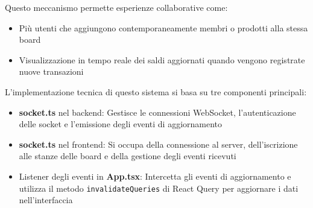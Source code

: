 \documentclass[11pt]{article}
\begin{document}
Questo meccanismo permette esperienze collaborative come:
\begin{itemize}
    \item Più utenti che aggiungono contemporaneamente membri o prodotti alla stessa board
    \item Visualizzazione in tempo reale dei saldi aggiornati quando vengono registrate nuove transazioni
\end{itemize}

L'implementazione tecnica di questo sistema si basa su tre componenti principali:
\begin{itemize}
    \item \textbf{socket.ts} nel backend: Gestisce le connessioni WebSocket, l'autenticazione delle socket e l'emissione degli eventi di aggiornamento
    \item \textbf{socket.ts} nel frontend: Si occupa della connessione al server, dell'iscrizione alle stanze delle board e della gestione degli eventi ricevuti
    \item Listener degli eventi in \textbf{App.tsx}: Intercetta gli eventi di aggiornamento e utilizza il metodo \texttt{invalidateQueries} di React Query per aggiornare i dati nell'interfaccia
\end{itemize}
\end{document}
